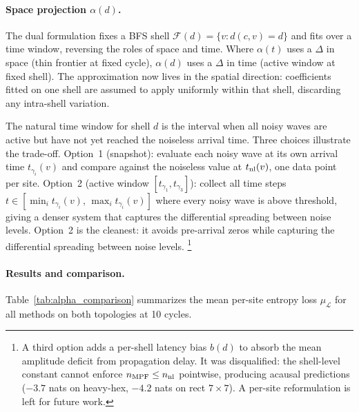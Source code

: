 \documentclass[12pt]{article}
\begin{document}
\paragraph{Space projection $\alpha(d)$.}
The dual formulation fixes a BFS shell $\mathcal{F}(d) = \{v : d(c,v) = d\}$
and fits over a time window, reversing the roles of space and time.
Where $\alpha(t)$ uses a $\Delta$ in space (thin frontier at fixed cycle),
$\alpha(d)$ uses a $\Delta$ in time (active window at fixed shell).
The approximation now lives in the spatial direction: coefficients fitted
on one shell are assumed to apply uniformly within that shell, discarding
any intra-shell variation.

The natural time window for shell $d$ is the interval when all noisy waves
are active but have not yet reached the noiseless arrival time.
Three choices illustrate the trade-off.
Option~1 (snapshot): evaluate each noisy wave at its own arrival time
$t_{\gamma_i}(v)$ and compare against the noiseless value at $t_{\rm nl}(v)$,
one data point per site.
Option~2 (active window $[t_{\gamma_1}, t_{\gamma_3}]$): collect all
time steps $t \in [\min_i t_{\gamma_i}(v),\, \max_i t_{\gamma_i}(v)]$
where every noisy wave is above threshold, giving a denser system that
captures the differential spreading between noise levels.
Option~2 is the cleanest: it avoids pre-arrival zeros while capturing
the differential spreading between noise levels.%
\footnote{A third option adds a per-shell latency bias $b(d)$ to absorb
the mean amplitude deficit from propagation delay.
It was disqualified: the shell-level constant cannot enforce
$n_{\rm MPF} \leq n_{\rm nl}$ pointwise, producing acausal predictions
($-3.7$ nats on heavy-hex, $-4.2$ nats on rect $7\times7$).
A per-site reformulation is left for future work.}

\paragraph{Results and comparison.}
Table~\ref{tab:alpha_comparison} summarizes the mean per-site entropy loss
$\mu_\mathcal{L}$ for all methods on both topologies at 10 cycles.
\end{document}
